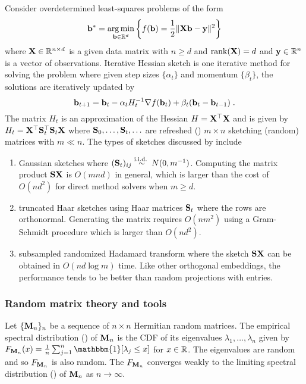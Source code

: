 \documentclass[10pt]{article}
\begin{document}
Consider overdetermined least-squares problems of the form
\[
\mathbf{b}^* = \operatorname*{arg\,min}_{\mathbf{b}\in\mathbb{R}^d}\left\{f(\mathbf{b}) = \frac{1}{2}\|\mathbf{X}\mathbf{b}-\mathbf{y}\|^2\right\}
\]
where $\mathbf{X}\in\mathbb{R}^{n\times d}$ is a given data matrix with $n\geq d$ and $\mathrm{rank}(\mathbf{X})=d$ and $\mathbf{y}\in\mathbb{R}^n$ is a vector of observations. Iterative Hessian sketch is one iterative method for solving the problem where given step sizes $\{\alpha_t\}$ and momentum $\{\beta_t\}$, the solutions are iteratively updated by
\[
\mathbf{b}_{t+1} = \mathbf{b}_t - \alpha_tH_t^{-1}\nabla f(\mathbf{b}_t)+\beta_t(\mathbf{b}_t-\mathbf{b}_{t-1}) \;.
\]
The matrix $H_t$ is an approximation of the Hessian $H=\mathbf{X}^\top\mathbf{X}$ and is given by $H_t=\mathbf{X}^\top \mathbf{S}_t^\top \mathbf{S}_t\mathbf{X}$ where $\mathbf{S}_0,\ldots,\mathbf{S}_t,\ldots$ are refreshed (\iid) $m\times n$ sketching (random) matrices with $m\ll n$. The types of sketches discussed by \citet{Lacotte:2020} include
\begin{enumerate}

\item
Gaussian sketches where $(\mathbf{S}_t)_{ij}\overset{\text{i.i.d.\ }}{\sim} N(0,m^{-1})$. Computing the matrix product $\mathbf{S}\mathbf{X}$ is $O(mnd)$ in general, which is larger than the cost of $O(nd^2)$ for direct method solvers when $m\geq d$.

\item
truncated Haar sketches using Haar matrices $\mathbf{S}_t$ where the rows are orthonormal. Generating the matrix requires $O(nm^2)$ using a Gram-Schmidt procedure which is larger than $O(nd^2)$.

\item
subsampled randomized Hadamard transform where the sketch $\mathbf{S}\mathbf{X}$ can be obtained in $O(nd\log m)$ time. Like other orthogonal embeddings, the performance tends to be better than random projections with \iid entries.

\end{enumerate}


\subsubsection{Random matrix theory and tools}

Let $\{\mathbf{M}_n\}_n$ be a sequence of $n\times n$ Hermitian random matrices. The empirical spectral distribution (\esd) of $\mathbf{M}_n$ is the CDF of its eigenvalues $\lambda_1,\ldots,\lambda_n$ given by $F_{\bfM_n}(x)=\frac{1}{n}\sum_{j=1}^n\mathbbm{1}[\lambda_j\leq x]$ for $x\in\mathbb{R}$. The eigenvalues are random and so $F_{\mathbf{M}_n}$ is also random. The \esd $F_{\mathbf{M}_n}$ converges weakly to the limiting spectral distribution (\lsd) of $\mathbf{M}_n$ as $n\rightarrow\infty$.
\\
\end{document}
